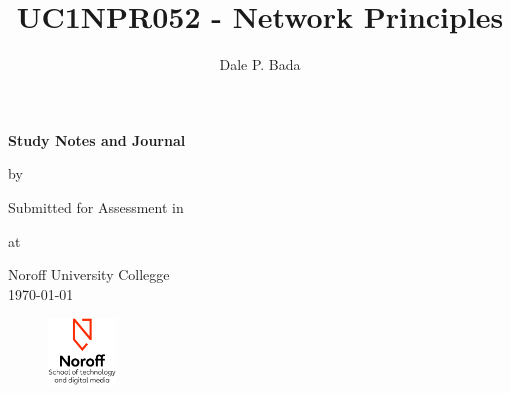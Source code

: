 \begin{titlepage}

  \begin{center}

      {\bfseries{\Huge{Study Notes and Journal}}}


      {\Large{by}}

    \begin{author}
      \author{\Large{Dale P. Bada}}
    \end{author}


    \vspace*{2.5cm}
    Submitted for Assessment in


    \begin{title}
        \title{\bfseries{\huge{UC1NPR052 - Network Principles}}}
    \end{title}

    \vspace*{2.5cm}
    at


    \Large{Noroff University Collegge\\
    \today}

    \vfill


    \begin{figure}[h!]
      \centering
      \includegraphics[height=50pt]{Noroff-Logo.png}
    \end{figure}


  \end{center}
\end{titlepage}
